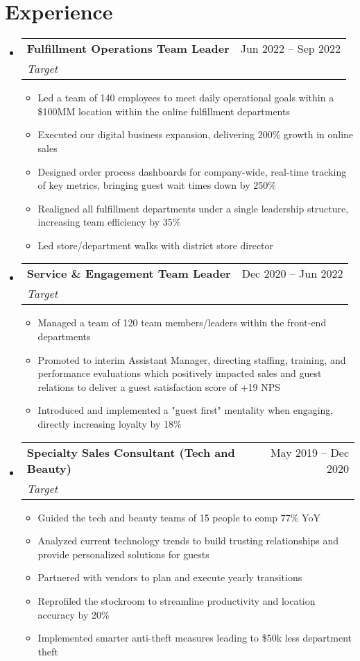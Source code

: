 \documentclass[letterpaper,11pt]{article}
\makeatletter
\newcommand{\resumeItem}[1]{
  \item\small{
    {#1 \vspace{-2pt}}
  }
}
\newcommand{\resumeSubheading}[4]{
  \vspace{-2pt}\item
    \begin{tabular*}{0.97\textwidth}[t]{l@{\extracolsep{\fill}}r}
      \textbf{#1} & #2 \\
      \textit{\small#3} & \textit{\small #4} \\
    \end{tabular*}\vspace{-7pt}
}
\newcommand{\resumeSubSubheading}[2]{
    \item
    \begin{tabular*}{0.97\textwidth}{l@{\extracolsep{\fill}}r}
      \textit{\small#1} & \textit{\small #2} \\
    \end{tabular*}\vspace{-7pt}
}
\newcommand{\resumeSubHeadingListStart}{\begin{itemize}[leftmargin=0.15in, label={}]}
\newcommand{\resumeSubHeadingListEnd}{\end{itemize}}
\newcommand{\resumeItemListStart}{\begin{itemize}}
\newcommand{\resumeItemListEnd}{\end{itemize}\vspace{-5pt}}
\makeatother
\begin{document}
\section{Experience}
  \resumeSubHeadingListStart
    \resumeSubheading
      {Fulfillment Operations Team Leader}{Jun 2022 -- Sep 2022}
      {Target}{}
      \resumeItemListStart
        \resumeItem{Led a team of 140 employees to meet daily operational goals within a \$100MM location within the online fulfillment departments}
        \resumeItem{Executed our digital business expansion, delivering 200\% growth in online sales}
        \resumeItem{Designed order process dashboards for company-wide, real-time tracking of key metrics, bringing guest wait times down by 250\%}
        \resumeItem{Realigned all fulfillment departments under a single leadership structure, increasing team efficiency by 35\%}
        \resumeItem{Led store/department walks with district store director}
      \resumeItemListEnd

    \resumeSubheading
      {Service \& Engagement Team Leader}{Dec 2020 -- Jun 2022}
      {Target}{}
      \resumeItemListStart
        \resumeItem{Managed a team of 120 team members/leaders within the front-end departments}
        \resumeItem{Promoted to interim Assistant Manager, directing staffing, training, and performance evaluations which positively impacted sales and guest relations to deliver a guest satisfaction score of +19 NPS}
        \resumeItem{Introduced and implemented a "guest first" mentality when engaging, directly increasing loyalty by 18\%}
      \resumeItemListEnd

    \resumeSubheading
      {Specialty Sales Consultant (Tech and Beauty)}{May 2019 -- Dec 2020}
      {Target}{}
      \resumeItemListStart
        \resumeItem{Guided the tech and beauty teams of 15 people to comp 77\% YoY}
        \resumeItem{Analyzed current technology trends to build trusting relationships and provide personalized solutions for guests}
        \resumeItem{Partnered with vendors to plan and execute yearly transitions}
        \resumeItem{Reprofiled the stockroom to streamline productivity and location accuracy by 20\%}
        \resumeItem{Implemented smarter anti-theft measures leading to \$50k less department theft}
      \resumeItemListEnd
      
  \resumeSubHeadingListEnd

\end{document}
